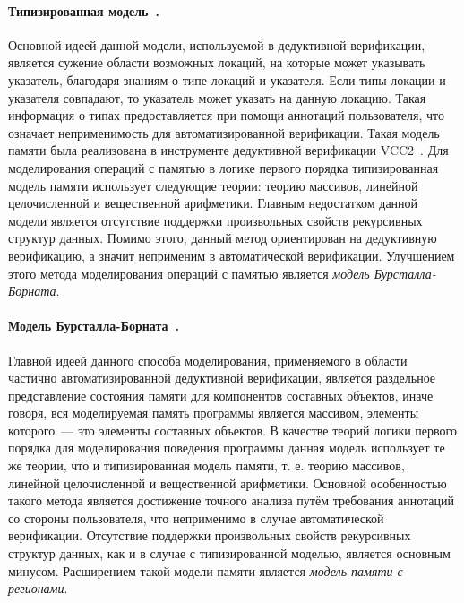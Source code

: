 \paragraph{Типизированная модель~\cite{cohen2009precise}.} Основной идеей данной модели, используемой в дедуктивной верификации, является сужение области возможных локаций, на которые может указывать указатель, благодаря знаниям о типе локаций и указателя. Если типы локации и указателя совпадают, то указатель может указать на данную локацию. Такая информация о типах предоставляется при помощи аннотаций пользователя, что означает неприменимость для автоматизированной верификации. Такая модель памяти была реализована в инструменте дедуктивной верификации VCC2~\cite{cohen2009vcc}. Для моделирования операций с памятью в логике первого порядка типизированная модель памяти использует следующие теории: теорию массивов, линейной целочисленной и вещественной арифметики. Главным недостатком данной модели является отсутствие поддержки произвольных свойств рекурсивных структур данных. Помимо этого, данный метод ориентирован на дедуктивную верификацию, а значит неприменим в автоматической верификации. Улучшением этого метода моделирования операций с памятью является \emph{модель Бурсталла-Борната}.

\paragraph{Модель Бурсталла-Борната~\cite{bornat2000proving}.} Главной идеей данного способа моделирования, применяемого в области частично автоматизированной дедуктивной верификации, является раздельное представление состояния памяти для компонентов составных объектов, иначе говоря, вся моделируемая память программы является массивом, элементы которого~--- это элементы составных объектов. В качестве теорий логики первого порядка для моделирования поведения программы данная модель использует те же теории, что и типизированная модель памяти, т. е. теорию массивов, линейной целочисленной и вещественной арифметики. Основной особенностью такого метода является достижение точного анализа путём требования аннотаций со стороны пользователя, что неприменимо в случае автоматической верификации. Отсутствие поддержки произвольных свойств рекурсивных структур данных, как и в случае с типизированной моделью, является основным минусом. Расширением такой модели памяти является \emph{модель памяти с регионами}.

